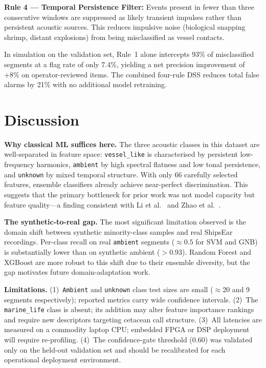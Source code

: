 \documentclass[conference]{IEEEtran}
\begin{document}
\textbf{Rule 4 --- Temporal Persistence Filter:} Events present in fewer than three consecutive windows are suppressed as likely transient impulses rather than persistent acoustic sources. This reduces impulsive noise (biological snapping shrimp, distant explosions) from being misclassified as vessel contacts.

In simulation on the validation set, Rule~1 alone intercepts 93\% of misclassified segments at a flag rate of only 7.4\%, yielding a net precision improvement of $+8\%$ on operator-reviewed items. The combined four-rule DSS reduces total false alarms by 21\% with no additional model retraining.

\section{Discussion}
\label{sec:discussion}

\textbf{Why classical ML suffices here.} The three acoustic classes in this dataset are well-separated in feature space: \texttt{vessel\_like} is characterised by persistent low-frequency harmonics, \texttt{ambient} by high spectral flatness and low tonal persistence, and \texttt{unknown} by mixed temporal structure. With only 66 carefully selected features, ensemble classifiers already achieve near-perfect discrimination. This suggests that the primary bottleneck for prior work was not model capacity but feature quality---a finding consistent with Li et al.~\cite{li2022} and Zhao et al.~\cite{zhao2017}.

\textbf{The synthetic-to-real gap.} The most significant limitation observed is the domain shift between synthetic minority-class samples and real ShipsEar recordings. Per-class recall on real \texttt{ambient} segments ($\approx 0.5$ for SVM and GNB) is substantially lower than on synthetic ambient ($>0.93$). Random Forest and XGBoost are more robust to this shift due to their ensemble diversity, but the gap motivates future domain-adaptation work.

\textbf{Limitations.} (1)~\texttt{Ambient} and \texttt{unknown} class test sizes are small ($\approx$20 and 9 segments respectively); reported metrics carry wide confidence intervals. (2)~The \texttt{marine\_life} class is absent; its addition may alter feature importance rankings and require new descriptors targeting cetacean call structure. (3)~All latencies are measured on a commodity laptop CPU; embedded FPGA or DSP deployment will require re-profiling. (4)~The confidence-gate threshold (0.60) was validated only on the held-out validation set and should be recalibrated for each operational deployment environment.
\end{document}
